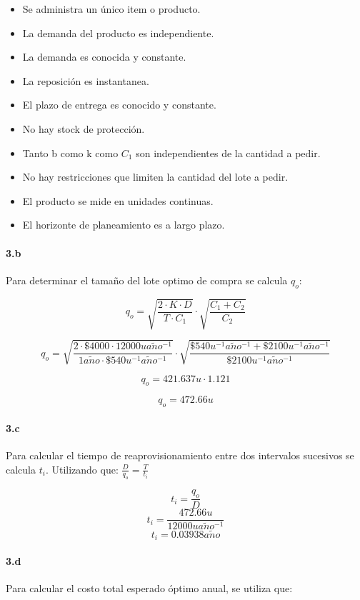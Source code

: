 \documentclass{article}
\def \anio {a\tilde{n}o}
\begin{document}
  \begin{itemize}
   \item Se administra un \'unico item o producto.
   \item La demanda del producto es independiente.
   \item La demanda es conocida y constante.
   \item La reposici\'on es instantanea.
   \item El plazo de entrega es conocido y constante.
   \item No hay stock de protecci\'on.
   \item Tanto b como k como $ C_1 $ son independientes de la cantidad a pedir.
   \item No hay restricciones que limiten la cantidad del lote a pedir.
   \item El producto se mide en unidades continuas.
   \item El horizonte de planeamiento es a largo plazo.
  \end{itemize}

  \paragraph{3.b}
  Para determinar el tama\~no del lote optimo de compra se calcula $ q_o $:
  
  $$ q_o = \sqrt{\frac{2 \cdot K \cdot D}{T \cdot C_1}} \cdot \sqrt{\frac{C_1 + C_2}{C_2}} $$
  
  $$q_o = \sqrt{\frac{2 \cdot \$4000  \cdot 12000 u \anio^{-1}}{1 \anio \cdot \$540 u^{-1}\anio^{-1}}} \cdot \sqrt{\frac{\$540 u^{-1}\anio^{-1} + \$2100 u^{-1}\anio^{-1}}{\$2100 u^{-1}\anio^{-1}}} $$

  $$q_o = 421.637 u \cdot 1.121 $$

  $$ \boxed{ q_o = 472.66 u } $$

  \paragraph{3.c}
  Para calcular el tiempo de reaprovisionamiento entre dos intervalos sucesivos se calcula $t_i$. Utilizando que: $ \frac{D}{q_o} = \frac{T}{t_i} $

  $$t_i = \frac{q_o}{D} $$
  $$t_i = \frac{472.66 u}{12000 u \anio^{-1}} $$
  $$\boxed{t_i = 0.03938 \anio} $$

  \paragraph{3.d}
  Para calcular el costo total esperado \'optimo anual, se utiliza que:
\end{document}
